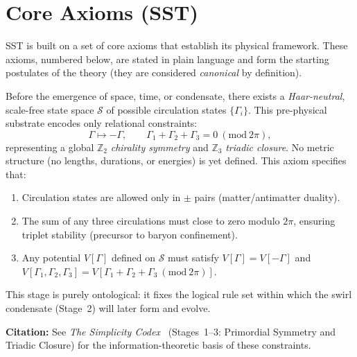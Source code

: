 \documentclass[10pt,reprint,aps,onecolumn,nofootinbib]{revtex4-2}
\begin{document}
	\section{Core Axioms (SST)}
	\label{sec:cosmogony-seven}
	SST is built on a set of core axioms that establish its physical framework. These axioms, numbered below, are stated in plain language and form the starting postulates of the theory (they are considered \emph{canonical} by definition).
    \begin{tcolorbox}[title=Axiom 0: Logical Substrate (Pre-Swirl Potential)]
    \label{axiom:logical-substrate}
    Before the emergence of space, time, or condensate, there exists a
    \emph{Haar-neutral}, scale-free state space $\mathcal{S}$ of possible circulation states
    $\{\Gamma_i\}$. This pre-physical substrate encodes only relational constraints:
    \[
        \Gamma \mapsto -\Gamma,
        \qquad
        \Gamma_1 + \Gamma_2 + \Gamma_3 = 0 \ (\mathrm{mod}\ 2\pi),
    \]
    representing a global $\mathbb{Z}_2$ \emph{chirality symmetry} and
    $\mathbb{Z}_3$ \emph{triadic closure}.
    No metric structure (no lengths, durations, or energies) is yet defined.
    This axiom specifies that:
    \begin{enumerate}
    \item Circulation states are allowed only in $\pm$ pairs (matter/antimatter duality).
    \item The sum of any three circulations must close to zero modulo $2\pi$, ensuring
    triplet stability (precursor to baryon confinement).
    \item Any potential $V[\Gamma]$ defined on $\mathcal{S}$ must satisfy
    $V[\Gamma]=V[-\Gamma]$ and $V[\Gamma_1,\Gamma_2,\Gamma_3] =
    V[\Gamma_1+\Gamma_2+\Gamma_3\ (\mathrm{mod}\ 2\pi)]$.
    \end{enumerate}
    This stage is purely ontological: it fixes the logical rule set within which the
    swirl condensate (Stage~2) will later form and evolve.
    \end{tcolorbox}

    \noindent\textbf{Citation:}
    See \emph{The Simplicity Codex}~\cite{Goldau2025_STC} (Stages~1--3: Primordial Symmetry
    and Triadic Closure) for the information-theoretic basis of these constraints.
\end{document}
